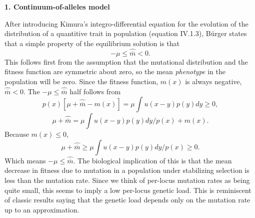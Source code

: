 \begin{flushright}
\textbf{1. Continuum-of-alleles model} \\
\end{flushright}

After introducing Kimura's integro-differential equation for the evolution of the distribution of a quantitive trait in
population (equation IV.1.3), B{\"u}rger states that a simple property of the equilibrium solution is that
\begin{equation}
-\mu \leq \hat{\overline{m}} < 0.
\end{equation}
This follows first from the assumption that the mutational distribution and the fitness function are symmetric about
zero, so the mean \emph{phenotype} in the population will be zero.  Since the fitness function, $m(x)$ is always
negative, $\hat{\overline{m}} < 0$. The $-\mu \leq \hat{\overline{m}}$ half follows from
\begin{equation}
p(x)\left[ \mu + \hat{\overline{m}} - m(x) \right] = \mu \int u(x-y) p(y) dy \geq 0,
\end{equation}
\begin{equation}
\mu + \hat{\overline{m}} = \mu \int u(x-y) p(y) dy / p(x) + m(x).
\end{equation}
Because $m(x) \leq 0$, 
\begin{equation}
\mu + \hat{\overline{m}} \geq \mu \int u(x-y) p(y) dy / p(x) \geq 0.
\end{equation}
Which means $-\mu \leq \hat{\overline{m}}$. The biological implication of this is that the mean decrease in fitness due to
mutation in a population under stabilizing selection is less than the mutation rate. Since we think of per-locus
mutation rates as being quite small, this seems to imply a low per-locus genetic load. This is reminiscent of classic
results saying that the genetic load depends only on the mutation rate up to an approximation.

